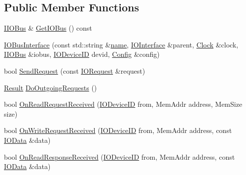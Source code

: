 \subsection*{Public Member Functions}
\begin{DoxyCompactItemize}
\item 
\hyperlink{class_simulator_1_1_i_i_o_bus}{I\+I\+O\+Bus} \& \hyperlink{class_simulator_1_1drisc_1_1_i_o_bus_interface_a83e4623d17e219ab45d866d2802c39e4}{Get\+I\+O\+Bus} () const 
\item 
\hyperlink{class_simulator_1_1drisc_1_1_i_o_bus_interface_a5c010c5723eadcb37a91148a00a7b369}{I\+O\+Bus\+Interface} (const std\+::string \&\hyperlink{mtconf_8c_a8f8f80d37794cde9472343e4487ba3eb}{name}, \hyperlink{class_simulator_1_1drisc_1_1_i_o_interface}{I\+O\+Interface} \&parent, \hyperlink{class_simulator_1_1_clock}{Clock} \&clock, \hyperlink{class_simulator_1_1_i_i_o_bus}{I\+I\+O\+Bus} \&iobus, \hyperlink{namespace_simulator_a3493d987c866ad6b8aaa704c42502db0}{I\+O\+Device\+I\+D} devid, \hyperlink{class_config}{Config} \&config)
\item 
bool \hyperlink{class_simulator_1_1drisc_1_1_i_o_bus_interface_ac6c390042b5ca2c51546c52d3ff171af}{Send\+Request} (const \hyperlink{struct_simulator_1_1drisc_1_1_i_o_bus_interface_1_1_i_o_request}{I\+O\+Request} \&request)
\item 
\hyperlink{namespace_simulator_a4b6b5616e7236c0c131516a441776805}{Result} \hyperlink{class_simulator_1_1drisc_1_1_i_o_bus_interface_a70d907b6303f0287296bb3649005330d}{Do\+Outgoing\+Requests} ()
\item 
bool \hyperlink{class_simulator_1_1drisc_1_1_i_o_bus_interface_a8be0bd101dcd908e28aa200c211499e7}{On\+Read\+Request\+Received} (\hyperlink{namespace_simulator_a3493d987c866ad6b8aaa704c42502db0}{I\+O\+Device\+I\+D} from, Mem\+Addr address, Mem\+Size size)
\item 
bool \hyperlink{class_simulator_1_1drisc_1_1_i_o_bus_interface_a25f360b2ef5d9b9d55faa428184fe28a}{On\+Write\+Request\+Received} (\hyperlink{namespace_simulator_a3493d987c866ad6b8aaa704c42502db0}{I\+O\+Device\+I\+D} from, Mem\+Addr address, const \hyperlink{struct_simulator_1_1_i_o_data}{I\+O\+Data} \&data)
\item 
bool \hyperlink{class_simulator_1_1drisc_1_1_i_o_bus_interface_a013a562fe3cd759b47615b00b5ae2ca0}{On\+Read\+Response\+Received} (\hyperlink{namespace_simulator_a3493d987c866ad6b8aaa704c42502db0}{I\+O\+Device\+I\+D} from, Mem\+Addr address, const \hyperlink{struct_simulator_1_1_i_o_data}{I\+O\+Data} \&data)
\item 

\end{DoxyCompactItemize}
